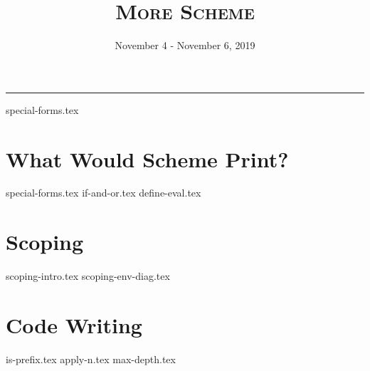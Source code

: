 \documentclass{exam}
\title{\textsc{More Scheme}}
\date{November 4 - November 6, 2019}
\begin{document}
\maketitle
\rule{\textwidth}{0.15em}
\fontsize{12}{15}\selectfont

{special-forms.tex}
\begin{questions}
\section{What Would Scheme Print?}
{special-forms.tex}
{if-and-or.tex}
{define-eval.tex}


\section{Scoping}
{scoping-intro.tex}
{scoping-env-diag.tex}


\section{Code Writing}
{is-prefix.tex}
{apply-n.tex}
{max-depth.tex}

\end{questions}
\end{document}
